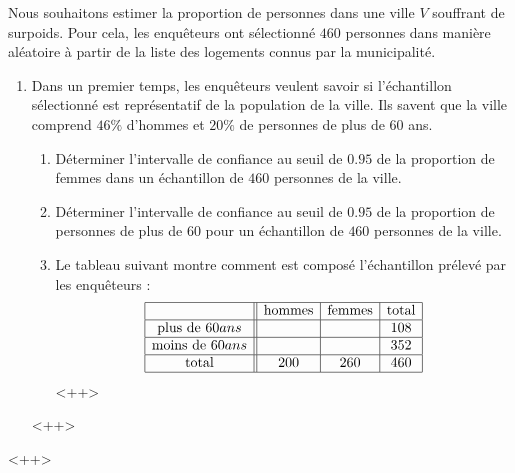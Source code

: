 
\begin{exercice}\label{exosmath-0349}

    Nous souhaitons estimer la proportion de personnes dans une ville \( V\) souffrant de surpoids. Pour cela, les enquêteurs ont sélectionné \( 460\) personnes dans manière aléatoire à partir de la liste des logements connus par la municipalité.
    \begin{enumerate}
        \item
            Dans un premier temps, les enquêteurs veulent savoir si l'échantillon sélectionné est représentatif de la population de la ville. Ils savent que la ville comprend \( 46\%\) d'hommes et \( 20\%\) de personnes de plus de \( 60\) ans.
            \begin{enumerate}
                \item
                    Déterminer l'intervalle de confiance au seuil de \( 0.95\) de la proportion de femmes dans un échantillon de \( 460\) personnes de la ville.
                \item
                    Déterminer l'intervalle de confiance au seuil de \( 0.95\) de la proportion de personnes de plus de \( 60\) pour un échantillon de \( 460\) personnes de la ville.
                \item
                    Le tableau suivant montre comment est composé l'échantillon prélevé par les enquêteurs :
                    \begin{equation*}
                        \begin{array}[]{|c||c|c|c|}
                            \hline
                            &\text{hommes}&\text{femmes}&\text{total}\\
                            \hline
                            \text{plus de \( 60\)} ans&&&108\\
                            \hline
                            \text{moins de \( 60\)} ans&&&352\\
                            \hline
                            \text{total}&200&260&460\\
                            \hline
                        \end{array}
                    \end{equation*}
                    <++>
            \end{enumerate}
            <++>
    \end{enumerate}
    <++>


\end{exercice}
